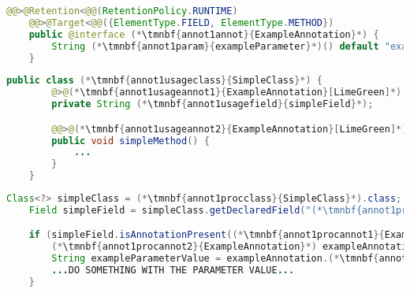 \example
\begin{lstlisting}[language=Java, title={Annotation processed during runtime, applicable to fields and methods}]
    @@>@Retention<@@(RetentionPolicy.RUNTIME)
    @@>@Target<@@({ElementType.FIELD, ElementType.METHOD})
    public @interface (*\tmnbf{annot1annot}{ExampleAnnotation}*) {
        String (*\tmnbf{annot1param}{exampleParameter}*)() default "example default value";
    }
\end{lstlisting}
\begin{lstlisting}[language=Java, title={Usage}]
    public class (*\tmnbf{annot1usageclass}{SimpleClass}*) {
        @>@(*\tmnbf{annot1usageannot1}{ExampleAnnotation}[LimeGreen]*)
        private String (*\tmnbf{annot1usagefield}{simpleField}*);

        @@>@(*\tmnbf{annot1usageannot2}{ExampleAnnotation}[LimeGreen]*)<@@((*\tmnbf{annot1usageparam}{exampleParameter}*) = "new value")
        public void simpleMethod() {
            ...
        }
    }
\end{lstlisting}
\begin{lstlisting}[language=Java, title={Runtime annotation processing}]
    Class<?> simpleClass = (*\tmnbf{annot1procclass}{SimpleClass}*).class;
    Field simpleField = simpleClass.getDeclaredField("(*\tmnbf{annot1procfield}{simpleField}[ForestGreen]*)");

    if (simpleField.isAnnotationPresent((*\tmnbf{annot1procannot1}{ExampleAnnotation}*).class)) {
        (*\tmnbf{annot1procannot2}{ExampleAnnotation}*) exampleAnnotation = simpleField.getAnnotation((*\tmnbf{annot1procannot3}{ExampleAnnotation}*).class);
        String exampleParameterValue = exampleAnnotation.(*\tmnbf{annot1procparam}{exampleParameter}*)();
        ...DO SOMETHING WITH THE PARAMETER VALUE...
    }
\end{lstlisting}
\newpage

